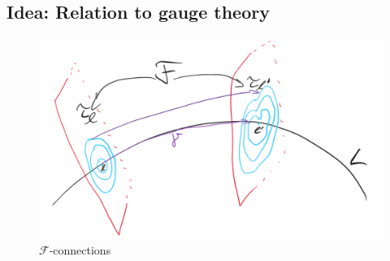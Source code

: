 \documentclass[hyperref={pdfpagelabels=false}]{beamer}
\newcommand\insertreferences{}
\theoremstyle{plain}
\theoremstyle{remark}
\begin{document}
%

\subsection{Idea: Relation to gauge theory}

\renewcommand\insertreferences{{\tiny Camille Laurent-Gengoux and Leonid Ryvkin, The neighborhood of a singular leaf. \newline \textit{Journal de l’{\'E}cole polytechnique-Math{\'e}matiques}, 8, 2021.}}

\begin{frame}
\begin{figure}[htbp]
	\centering
		\includegraphics[width=1.00\textwidth]{Foliation connection.png}
	\caption{$\mathcal{F}$-connections}
	\label{fig:Foliation connection}
\end{figure}

\end{frame}
\end{document}
